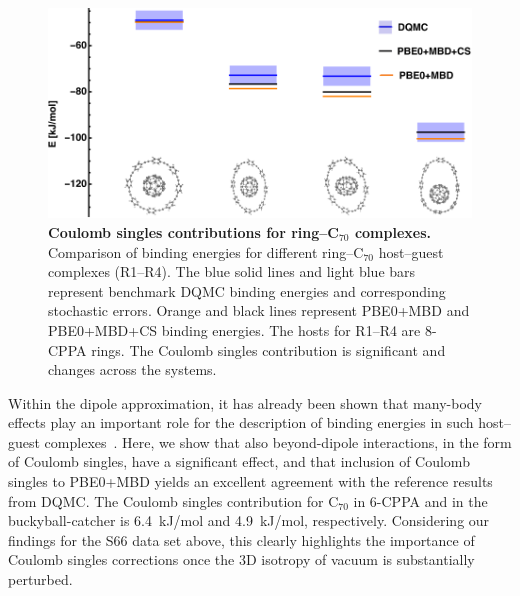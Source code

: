 \documentclass[aps,prl,groupaddress, twocolumn]{revtex4-1}  %
\begin{document}
\begin{figure}[hbtp]
\includegraphics[scale=1.]{Plots/Rings_new.pdf}
\caption{\textbf{Coulomb singles contributions for ring--C$_{70}$ complexes.} Comparison of binding energies for different ring--C$_{70}$ host--guest complexes (R1--R4). The blue solid lines and light blue bars represent benchmark DQMC binding energies and corresponding stochastic errors. Orange and black lines represent PBE0+MBD and PBE0+MBD+CS binding energies. The hosts for R1--R4 are 8-CPPA rings. The Coulomb singles contribution is significant and changes across the systems.}\label{fig:rings}
\end{figure}

Within the dipole approximation, it has already been shown that many-body effects play an important role for the description of binding energies in such host--guest complexes~\cite{hermann_ncomm2017}. Here, we show that also beyond-dipole interactions, in the form of Coulomb singles, have a significant effect, and that inclusion of Coulomb singles to PBE0+MBD yields an excellent agreement with the reference results from DQMC\@. The Coulomb singles contribution for C$_{70}$ in 6-CPPA and in the buckyball-catcher is 6.4~kJ/mol and 4.9~kJ/mol, respectively. Considering our findings for the S66 data set above, this clearly highlights the importance of Coulomb singles corrections %
once the 3D isotropy of vacuum is substantially perturbed. 
\end{document}
